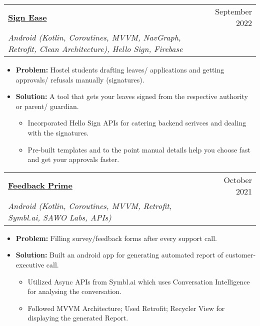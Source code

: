 \documentclass[apaper,20pt]{article}
\makeatletter
\newcommand{\MYhref}[3][blue]{\href{#2}{\color{#1}{#3}}}%
\newcommand{\resumeSubheading}[4]{
  \vspace{-1pt}\item
    \begin{tabular*}{0.97\textwidth}{l@{\extracolsep{\fill}}r}
      \textbf{#1} & #2 \\
      \textit{#3} & \textit{#4} \\
    \end{tabular*}\vspace{-5pt}
}
\makeatother
\begin{document}
\resumeSubheading{\href{https://github.com/itsnitish22/Sign-Ease}{Sign Ease} {\MYhref[red]{https://play.google.com/store/apps/details?id=com.teamdefine.signease} {[Playstore]}}}{September 2022}
{Android (Kotlin, Coroutines, MVVM, NavGraph, Retrofit, Clean Architecture), Hello Sign, Firebase}{}
\begin{itemize}
	\item \textbf {Problem:} Hostel students drafting leaves/ applications and getting approvals/ refusals manually (signatures). 
	      \vspace{-2pt}
	\item \textbf {Solution:} A tool that gets your leaves signed from the respective authority or parent/ guardian.
	      \begin{itemize}
	      	\item{Incorporated Hello Sign APIs for catering backend serivces and dealing with the signatures.}
	      	\item{Pre-built templates and to the point manual details help you choose fast and get your approvals faster.}
	      \end{itemize}
\end{itemize} 
\vspace{-3pt}

\resumeSubheading{\href{https://github.com/itsnitish22/Feedback-Prime}{Feedback Prime}}{October 2021}
{Android (Kotlin, Coroutines, MVVM, Retrofit, Symbl.ai, SAWO Labs, APIs)}{}
\begin{itemize}
	\item \textbf {Problem:} Filling survey/feedback forms after every support call.
	      \vspace{-2pt}
	\item \textbf {Solution:} Built an android app for generating automated report of customer-executive call.
	      \begin{itemize}
	      	\item{Utilized Async APIs from Symbl.ai which uses Conversation Intelligence for analysing the conversation.}
	      	\item{Followed MVVM Architecture; Used Retrofit;  Recycler View for displaying the generated Report.}
	      \end{itemize}
\end{itemize}
\vspace{-3pt}   
\end{document}
